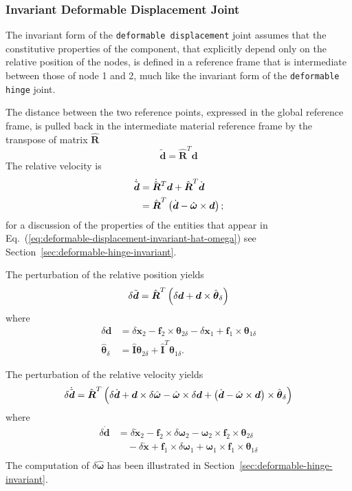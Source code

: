 \documentclass[10pt,dvips,fleqn]{report}
\newcommand{\T}[1]{\boldsymbol{#1}}
\newcommand{\TT}[1]{\boldsymbol{#1}}
\begin{document}
\subsubsection{Invariant Deformable Displacement Joint}
The invariant form of the \texttt{deformable displacement} joint
assumes that the constitutive properties of the component,
that explicitly depend only on the relative position 
of the nodes, is defined in a reference frame that is intermediate
between those of node 1 and 2, much like the invariant form
of the \texttt{deformable hinge} joint.

The distance between the two reference points, expressed
in the global reference frame, is pulled back in the 
intermediate material reference frame by the transpose
of matrix $\hat{\TT{R}}$
\begin{equation}
	\tilde{\T{d}} = \hat{\TT{R}}^T \T{d}
\end{equation}
The relative velocity is
\begin{align}
	\dot{\tilde{\T{d}}}
	&= \dot{\hat{\TT{R}}}^T \T{d} + \hat{\TT{R}}^T \dot{\T{d}}
		\nonumber \\
	&= \hat{\TT{R}}^T \plbr{
		\dot{\T{d}} - \hat{\T{\omega}} \times \T{d}
	} ;
\end{align}
for a discussion of the properties of the entities
that appear in Eq.~(\ref{eq:deformable-displacement-invariant-hat-omega})
see Section~\ref{sec:deformable-hinge-invariant}.

The perturbation of the relative position yields
\begin{equation}
	\delta\tilde{\T{d}} = \hat{\TT{R}}^T \plbr{
		\delta\T{d} + \T{d} \times \hat{\T{\theta}}_{\delta}
	}
\end{equation}
where
\begin{align}
	\delta\T{d}
	&= \delta\T{x}_2 - \T{f}_2 \times \T{\theta}_{2\delta}
		- \delta\T{x}_1 + \T{f}_1 \times \T{\theta}_{1\delta} \\
	\hat{\T{\theta}}_{\delta}
	&= \hat{\TT{I}} \T{\theta}_{2\delta} + \hat{\TT{I}}^T \T{\theta}_{1\delta} .
\end{align}

The perturbation of the relative velocity yields
\begin{equation}
	\delta\dot{\tilde{\T{d}}} = \hat{\TT{R}}^T \plbr{
		\delta\dot{\T{d}}
		+ \T{d} \times \delta\hat{\T{\omega}}
		- \hat{\T{\omega}} \times \delta\T{d}
		+ \plbr{\dot{\T{d}} - \hat{\T{\omega}} \times \T{d}} \times \hat{\T{\theta}}_{\delta}
	}
\end{equation}
where
\begin{align}
	\delta\dot{\T{d}}
	&= \delta\dot{\T{x}}_2
		- \T{f}_2 \times \delta\T{\omega}_{2}
		- \T{\omega}_{2} \times \T{f}_2 \times \T{\theta}_{2\delta}
			\nonumber \\
		& \quad - \delta\dot{\T{x}}
		+ \T{f}_1 \times \delta\T{\omega}_{1}
		+ \T{\omega}_{1} \times \T{f}_1 \times \T{\theta}_{1\delta} \\
\end{align}
The computation of $\delta\hat{\T{\omega}}$ has been illustrated
in Section~\ref{sec:deformable-hinge-invariant}.
\end{document}
